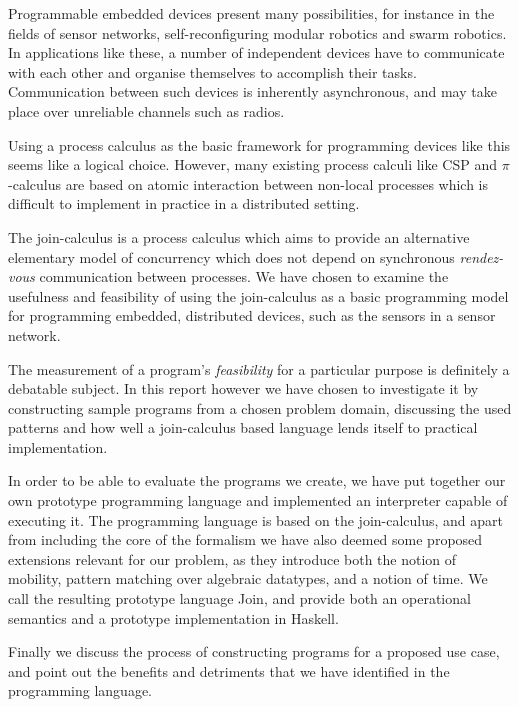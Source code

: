 
Programmable embedded devices present many possibilities, for instance in the
fields of sensor networks, self-reconfiguring modular robotics and swarm
robotics. In applications like these, a number of independent devices have to
communicate with each other and organise themselves to accomplish their tasks.
Communication between such devices is inherently asynchronous, and may take
place over unreliable channels such as radios.

Using a process calculus as the basic framework for programming devices like
this seems like a logical choice. However, many existing process calculi like
CSP\cite{hoare-csp} and $\pi$-calculus\cite{milner-pi} are based on atomic
interaction between non-local processes which is difficult to implement in
practice in a distributed setting.

The join-calculus\cite{fournet1996reflexive} is a process calculus which aims to
provide an alternative elementary model of concurrency which does not depend on
synchronous \emph{rendez-vous} communication between processes. We have chosen
to examine the usefulness and feasibility of using the join-calculus as a
basic programming model for programming embedded, distributed devices, such as
the sensors in a sensor network.

The measurement of a program's \emph{feasibility} for a particular purpose is
definitely a debatable subject. In this report however we have chosen to
investigate it by constructing sample programs from a chosen problem domain,
discussing the used patterns and how well a join-calculus based language lends
itself to practical implementation.

In order to be able to evaluate the programs we create, we have put together our
own prototype programming language and implemented an interpreter capable of
executing it. The programming language is based on the join-calculus, and apart
from including the core of the formalism we have also deemed some proposed
extensions relevant for our problem, as they introduce both the notion of
mobility, pattern matching over algebraic datatypes, and a notion of time. We
call the resulting prototype language Join, and provide both an operational
semantics and a prototype implementation in Haskell.

Finally we discuss the process of constructing programs for a proposed use case,
and point out the benefits and detriments that we have identified in the
programming language.
